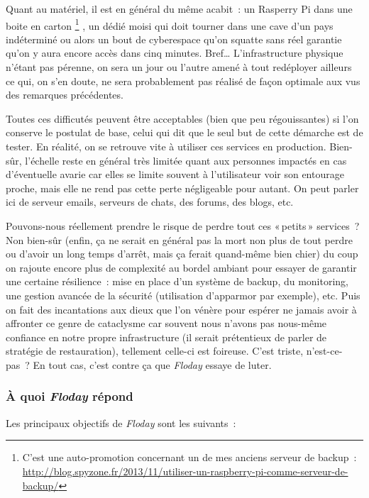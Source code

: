 Quant au matériel, il est en général du même acabit~: un Rasperry Pi dans une boite en carton%
\footnote{C'est une auto-promotion concernant un de mes anciens serveur de backup~: \url{http://blog.spyzone.fr/2013/11/utiliser-un-raspberry-pi-comme-serveur-de-backup/}}%
, un dédié moisi qui doit tourner dans une cave d'un pays indéterminé ou alors un bout de cyberespace qu'on squatte sans réel garantie qu'on y aura encore accès dans cinq minutes.
Bref\dots{} L'infrastructure physique n'étant pas pérenne, on sera un jour ou l'autre amené à tout redéployer ailleurs ce qui, on s'en doute, ne sera probablement pas réalisé de façon optimale aux vus des remarques précédentes.

Toutes ces difficutés peuvent être acceptables (bien que peu régouissantes) si l'on conserve le postulat de base, celui qui dit que le seul but de cette démarche est de tester.
En réalité, on se retrouve vite à utiliser ces services en production.
Bien-sûr, l'échelle reste en général très limitée quant aux personnes impactés en cas d'éventuelle avarie car elles se limite souvent à l'utilisateur voir son entourage proche, mais elle ne rend pas cette perte négligeable pour autant.
On peut parler ici de serveur emails, serveurs de chats, des forums, des blogs, etc.

Pouvons-nous réellement prendre le risque de perdre tout ces «\,petits\,» services~?
Non bien-sûr (enfin, ça ne serait en général pas la mort non plus de tout perdre ou d'avoir un long temps d'arrêt, mais ça ferait quand-même bien chier)
du coup on rajoute encore plus de complexité au bordel ambiant pour essayer de garantir une certaine résilience~: mise en place d'un système de backup, du monitoring, une gestion avancée de la sécurité (utilisation d'apparmor par exemple), etc.
Puis on fait des incantations aux dieux que l'on vénère pour espérer ne jamais avoir à affronter ce genre de cataclysme car souvent nous n'avons pas nous-même confiance en notre propre infrastructure (il serait prétentieux de parler de stratégie de restauration), tellement celle-ci est foireuse.
C'est triste, n'est-ce-pas~? En tout cas, c'est contre ça que \emph{Floday} essaye de luter.

\subsubsection{À quoi \emph{Floday} répond}
Les principaux objectifs de \emph{Floday} sont les suivants~:
